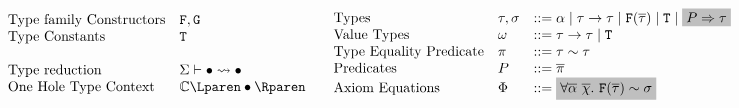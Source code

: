 \documentclass[format=acmsmall,manuscript,review,screen,nonacm,margin=1in,11pt]{acmart}
\begin{document}
\begin{figure}[ht]
    \footnotesize
  \[
    \begin{array}{l l l}
      &\text{Type family Constructors} &\FamCtrs,\MoreFamCtrs\\
      &\text{Type Constants} &\texttt{\TypeCtrs}\\      
      \\
      &\text{Type reduction}              &\tystepsto\GEnv\bullet\bullet\\
      &\text{One Hole Type Context}    &\TEvalCtxt{\bullet}
    \end{array}
    \begin{array}{l l l l l}
      &\text{Types}           &\tau,\sigma  &\bnfeq \alpha \bnfor \tau\to\tau %
                                              \bnfor \FamCtrs(\many\tau) \bnfor \TypeCtrs
                                              \bnfor \text{\shaded{$\Preds\then\tau$}}&\\
      &\text{Value Types}    &\GTy         &\bnfeq \tau\to\tau \bnfor \TypeCtrs\\
      &\text{Type Equality Predicate}      &\pi       &\bnfeq \tau\teq\tau\\
      &\text{Predicates}                   &\Preds    &\bnfeq \many\pi\\
      &\text{Axiom Equations} &\AxiomEq     &\bnfeq \text{\shaded{$\Forall{\many\alpha~\many\chi}{\FamCtrs(\many\tau)
                                              \teq \sigma$}}}\\

\end{array}\]
\end{figure}
\end{document}
